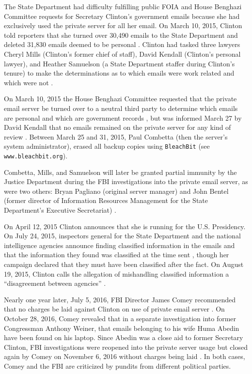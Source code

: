 \documentclass[journal]{vgtc}                %
\begin{document}
The State Department had difficulty fulfilling public FOIA and House Benghazi Committee requests \cite{TakingRootWashPost} for Secretary Clinton's government emails because she had exclusively used the private server for all her email.  On March 10, 2015,  Clinton told reporters that she turned over 30,490 emails to the State Department and deleted 31,830 emails deemed to be personal \cite{WashPostTimeline}.    Clinton had tasked three lawyers Cheryl Mills (Clinton's former chief of staff),  David Kendall (Clinton's personal lawyer), and Heather Samuelson (a State Department staffer during Clinton's tenure) to make the determinations as to which emails were work related and which were not \cite{emailVetting, thompsonTimeline}.   

On March 10, 2015 the House Benghazi Committee requested that the private email server be turned over to a neutral third party to determine which emails are personal and which are government records \cite{serverRequest}, but was informed March 27 by David Kendall that no emails remained on the private server for any kind of review \cite{serverScrubbedLawyer}.
Between March 25 and 31, 2015, Paul Combetta (then the server's system administrator), erased all backup copies using \texttt{BleachBit} (see \texttt{www.bleachbit.org}).    

Combetta, Mills, and Samuelson will later be granted partial immunity by the Justice Department during the FBI investigations into the private email server, as were two others: Bryan Pagliano (original server manager) and  John Bentel (former director of Information Resources Management for the State Department's Executive Secretariat) \cite{immunityPolitico, immunityDailyCaller, immunityIT}.  

On April 12, 2015 Clinton announces that she is running for the U.S. Presidency.  On July 24, 2015, inspectors general for the State Department  and the national intelligence agencies announce finding classified information in the emails and that the information they found was classified at the time sent \cite{serverClassified}, though her campaign declared that they must have been classified after the fact. On August 19, 2015, Clinton calls the allegation of mishandling classified information a ``disagreement between agencies'' \cite{clintonDenialGuardian}.

Nearly one year later, July 5, 2016,  FBI Director James Comey recommended that no charges be laid against Clinton on use of private email server \cite{nochargeFBI}.  On October 28, 2016, Comey revealed that in a separate investigation into former Congressman Anthony Weiner, that emails belonging to his wife Huma Abedin have been found on his laptop.  Since Abedin was a close aid to former Secretary Clinton, FBI investigations were reopened into the private server usage but closed again by Comey on November 6, 2016 without charges being laid \cite{nochargeFBINov}.  In both cases, Comey and the FBI are criticized by pundits from different political parties.
\end{document}
